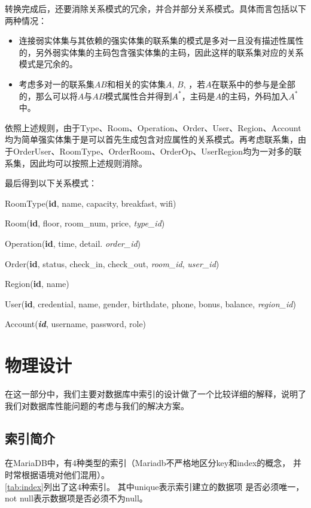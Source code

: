 \documentclass{myreport}
\begin{document}
转换完成后，还要消除关系模式的冗余，并合并部分关系模式。具体而言包括以下两种情况：

\begin{itemize}
	\item 连接弱实体集与其依赖的强实体集的联系集的模式是多对一且没有描述性属性的，另外弱实体集的主码包含强实体集的主码，因此这样的联系集对应的关系模式是冗余的。
	\item 考虑多对一的联系集$AB$和相关的实体集$A$, $B$, ，若$A$在联系中的参与是全部的，那么可以将$A$与$AB$模式属性合并得到$A^*$，主码是$A$的主码，外码加入$A^*$中。
\end{itemize}

依照上述规则，由于Type、Room、Operation、Order、User、Region、Account均为简单强实体集于是可以首先生成包含对应属性的关系模式。再考虑联系集，由于OrderUser、RoomType、OrderRoom、OrderOp、UserRegion均为一对多的联系集，因此均可以按照上述规则消除。

最后得到以下关系模式：

RoomType(\textbf{id}, name, capacity, breakfast, wifi)

Room(\textbf{id}, floor, room\_num, price, \textit{type\_id})

Operation(\textbf{id}, time, detail. \textit{order\_id})

Order(\textbf{id}, status, check\_in, check\_out, \textit{room\_id}, \textit{user\_id})

Region(\textbf{id}, name)

User(\textbf{id}, credential, name, gender, birthdate, phone, bonus, balance, \textit{region\_id})

Account(\textit{\textbf{id}}, username, password, role)


\section{物理设计}

在这一部分中，我们主要对数据库中索引的设计做了一个比较详细的解释，说明了我们对数据库性能问题的考虑与我们的解决方案。

\subsection{索引简介}
在MariaDB中，有4种类型的索引（Mariadb不严格地区分key和index的概念，
并时常根据语境对他们混用）。\\

\autoref{tab:index}列出了这4种索引。 其中unique表示索引建立的数据项
是否必须唯一，not null表示数据项是否必须不为null。\\
\end{document}
